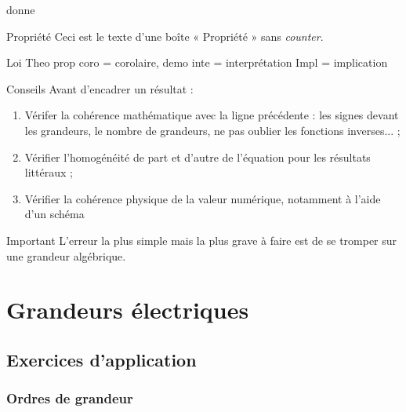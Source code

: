 \documentclass[10pt,a5paper,notitlepage]{book}
\begin{document}
donne

\begin{NCprop}{Propriété}
    Ceci est le texte d'une boîte « Propriété » sans \textit{counter}.
\end{NCprop}

Loi
Theo
prop
coro = corolaire,
demo
inte = interprétation
Impl = implication

\begin{NCcoro}{Conseils}
    Avant d'encadrer un résultat :
    \begin{enumerate}
        \item Vérifer la cohérence mathématique avec la ligne précédente : les
            signes devant les grandeurs, le nombre de grandeurs, ne pas oublier
            les fonctions inverses... ;
        \item Vérifier l'homogénéité de part et d'autre de l'équation pour les
            résultats littéraux ;
        \item Vérifier la cohérence physique de la valeur numérique, notamment à
            l'aide d'un schéma
    \end{enumerate}
\end{NCcoro}

\begin{NCimpo}{Important}
    L'erreur la plus simple mais la plus grave à faire est de se tromper sur une
    grandeur algébrique.
    \begin{center}
    \end{center}
\end{NCimpo}

\chapter{Grandeurs électriques}\label{ch:O1}
\vspace*{-24pt}
\section{Exercices d'application}
\subsection{Ordres de grandeur}

\end{document}
